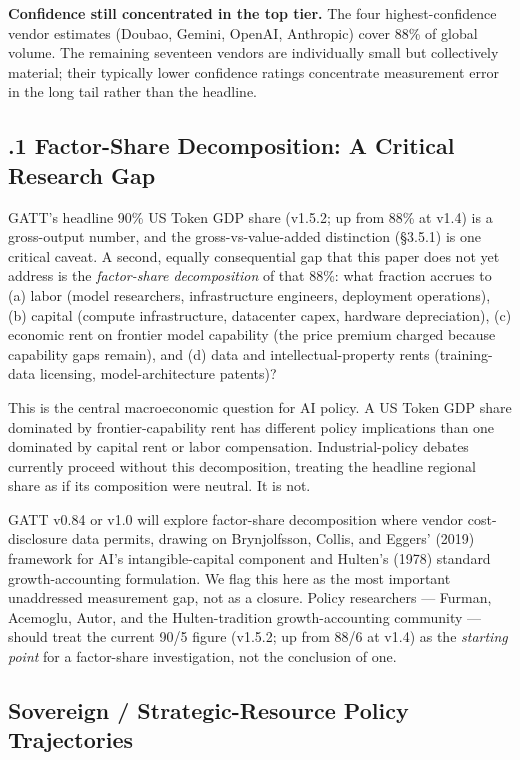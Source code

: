 \documentclass[11pt,a4paper]{article}
\begin{document}
\textbf{Confidence still concentrated in the top tier.} The four highest-confidence vendor estimates (Doubao, Gemini, OpenAI, Anthropic) cover 88\% of global volume. The remaining seventeen vendors are individually small but collectively material; their typically lower confidence ratings concentrate measurement error in the long tail rather than the headline.

\subsection{.1 Factor-Share Decomposition: A Critical Research Gap}

GATT's headline 90\% US Token GDP share (v1.5.2; up from 88\% at v1.4) is a gross-output number, and the gross-vs-value-added distinction (§3.5.1) is one critical caveat. A second, equally consequential gap that this paper does not yet address is the \emph{factor-share decomposition} of that 88\%: what fraction accrues to (a) labor (model researchers, infrastructure engineers, deployment operations), (b) capital (compute infrastructure, datacenter capex, hardware depreciation), (c) economic rent on frontier model capability (the price premium charged because capability gaps remain), and (d) data and intellectual-property rents (training-data licensing, model-architecture patents)?

This is the central macroeconomic question for AI policy. A US Token GDP share dominated by frontier-capability rent has different policy implications than one dominated by capital rent or labor compensation. Industrial-policy debates currently proceed without this decomposition, treating the headline regional share as if its composition were neutral. It is not.

GATT v0.84 or v1.0 will explore factor-share decomposition where vendor cost-disclosure data permits, drawing on Brynjolfsson, Collis, and Eggers' (2019) framework for AI's intangible-capital component and Hulten's (1978) standard growth-accounting formulation. We flag this here as the most important unaddressed measurement gap, not as a closure. Policy researchers --- Furman, Acemoglu, Autor, and the Hulten-tradition growth-accounting community --- should treat the current 90/5 figure (v1.5.2; up from 88/6 at v1.4) as the \emph{starting point} for a factor-share investigation, not the conclusion of one.

\subsection{Sovereign / Strategic-Resource Policy Trajectories}
\end{document}
